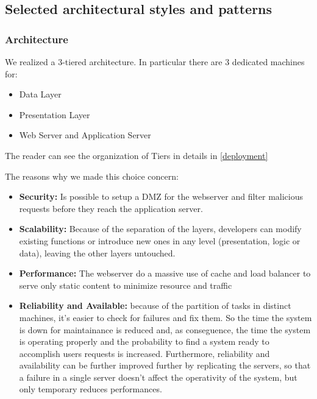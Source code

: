 \newpage

\subsection{Selected architectural styles and patterns}

\subsubsection{Architecture}

We realized a 3-tiered architecture. In particular there are 3 dedicated machines for:

\begin{itemize}
\item Data Layer
\item Presentation Layer
\item Web Server and Application Server
\end{itemize}

The reader can see the organization of Tiers in details in \ref{deployment} \newline

 The reasons why we made this choice concern:

\begin{itemize}
\item {\textbf{Security:}} Is possible to setup a DMZ for the webserver and filter malicious requests before they reach the application server.
\item {\textbf{Scalability:}} Because of the separation of the layers, developers can modify existing functions or introduce new ones in any level (presentation, logic or data), leaving the other layers untouched.
\item {\textbf{Performance:} The webserver do a massive use of cache and load balancer to serve only static content to minimize resource and traffic}
\item {\textbf{Reliability and Available:}} because of the partition of tasks in distinct machines, it's easier to check for failures and fix them. So the time the system is down for maintainance is reduced and, as conseguence, the time the system is operating properly and the probability to find a system ready to accomplish users requests is increased. Furthermore, reliability and availability can be further improved further by replicating the servers, so that a failure in a single server doesn't affect the operativity of the system,  but only temporary reduces performances.
\end{itemize}


